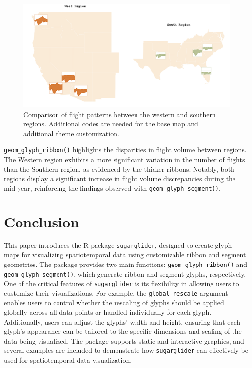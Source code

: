 \begin{figure}

{\centering \includegraphics[width=1\linewidth]{figures/west_south} 

}

\caption{Comparison of flight patterns between the western and southern regions. Additional codes are needed for the base map and additional theme customization.}\label{fig:unnamed-chunk-27}
\end{figure}

\texttt{geom\_glyph\_ribbon()} highlights the disparities in flight volume between regions. The Western region exhibits a more significant variation in the number of flights than the Southern region, as evidenced by the thicker ribbons. Notably, both regions display a significant increase in flight volume discrepancies during the mid-year, reinforcing the findings observed with \texttt{geom\_glyph\_segment()}.

\hypertarget{conclusion}{%
\section{Conclusion}\label{conclusion}}

This paper introduces the R package \texttt{sugarglider}, designed to create glyph maps for visualizing spatiotemporal data using customizable ribbon and segment geometries. The package provides two main functions: \texttt{geom\_glyph\_ribbon()} and \texttt{geom\_glyph\_segment()}, which generate ribbon and segment glyphs, respectively. One of the critical features of \texttt{sugarglider} is its flexibility in allowing users to customize their visualizations. For example, the \texttt{global\_rescale} argument enables users to control whether the rescaling of glyphs should be applied globally across all data points or handled individually for each glyph. Additionally, users can adjust the glyphs' width and height, ensuring that each glyph's appearance can be tailored to the specific dimensions and scaling of the data being visualized. The package supports static and interactive graphics, and several examples are included to demonstrate how \texttt{sugarglider} can effectively be used for spatiotemporal data visualization.

